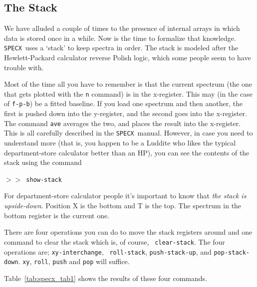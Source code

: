 \documentclass[11pt,twoside]{article}
\newcommand{\SPECX}{{\tt SPECX}}
\newcommand{\SP}{{$>\!>$}}
\begin{document}
\subsection{The Stack}
\label{sec:specx_6}
We have alluded a couple of times to the presence of internal arrays
in which data is stored once in a while. Now is the time to formalize
that knowledge.
\SPECX\ uses a `stack' to keep spectra in order.  The stack is modeled after
the Hewlett-Packard calculator reverse Polish logic, which some people
seem to have trouble with.

Most of the time all you have to remember is that the current spectrum
(the one that gets plotted with the {\tt n} command) is in the
x-register. This may (in the case of {\tt f-p-b}) be a fitted
baseline. If you load one spectrum and then another, the first is
pushed down into the y-register, and the second goes into the
x-register. The command {\tt ave} averages the two, and places the
result into the x-register. This is all carefully described in the
\SPECX\ manual. However, in case you need to understand more (that is,
you happen to be a Luddite who likes the typical department-store
calculator better than an HP), you can see the contents of the stack
using the command

\SP\ \verb|show-stack|

For department-store calculator people it's important to know that
{\em the stack is upside-down}. Position X is the bottom and T is the
top.  The spectrum in the bottom register is the current one.

There are four operations you can do to move the stack registers
around and one command to clear the stack which is, of course, {\tt
clear-stack}. The four operations are; {\tt xy-interchange}, {\tt
roll-stack}, {\tt push-stack-up}, and {\tt pop-stack-down}. {\tt xy},
{\tt roll}, {\tt push} and {\tt pop} will suffice.

Table~\ref{tab:specx_tab1} shows the results of these four commands.
\end{document}
